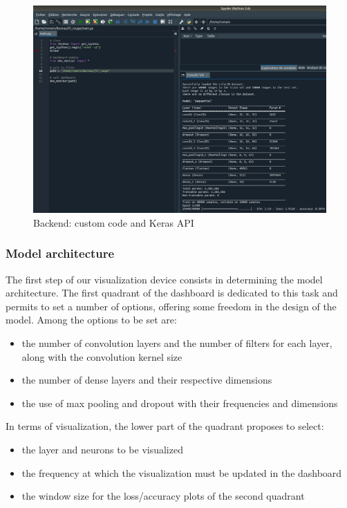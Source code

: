 \begin{figure}[H]
    \centering
    \includegraphics[scale=0.41]{images/weights-grads-viewer/backend.png}
    \caption{Backend: custom code and Keras API}
\end{figure}

\subsubsection{Model architecture}

The first step of our visualization device consists in determining the model architecture. The first quadrant of the dashboard is dedicated to this task and permits to set a number of options, offering some freedom in the design of the model. Among the options to be set are:

\begin{itemize}
    \item the number of convolution layers and the number of filters for each layer, along with the convolution kernel size
    \item the number of dense layers and their respective dimensions
    \item the use of max pooling and dropout with their frequencies and dimensions
\end{itemize} 

In terms of visualization, the lower part of the quadrant proposes to select:

\begin{itemize}
	\item the layer and neurons to be visualized
	\item the frequency at which the visualization must be updated in the dashboard
	\item the window size for the loss/accuracy plots of the second quadrant
\end{itemize} 

